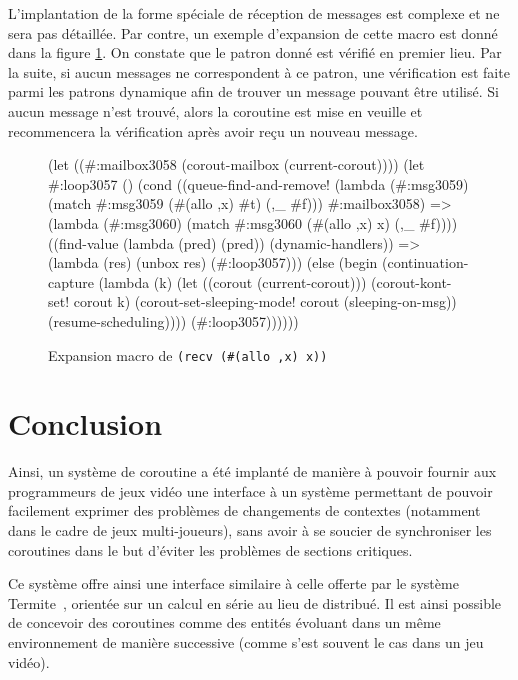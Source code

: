 \documentclass[12pt,oneside,letterpaper,francais]{book}
\newcommand{\scheme}[1]{\selectlanguage{english}{\tt #1}\selectlanguage{french}}
\begin{document}
L'implantation de la forme spéciale de réception de messages
\scheme{recv} est complexe et ne sera pas détaillée. Par contre, un
exemple d'expansion de cette macro est donné dans la figure
\ref{Corout:recv-exp}. On constate que le patron donné est vérifié en
premier lieu. Par la suite, si aucun messages ne correspondent à ce
patron, une vérification est faite parmi les patrons dynamique afin de
trouver un message pouvant être utilisé. Si aucun message n'est
trouvé, alors la coroutine est mise en veuille et recommencera la
vérification après avoir reçu un nouveau message.

\begin{figure}[htb!]
  \begin{schemecode}
(let ((\#:mailbox3058 (corout-mailbox (current-corout))))
  (let \#:loop3057 ()
    (cond ((queue-find-and-remove!
            (lambda (\#:msg3059) (match \#:msg3059 (\#(allo ,x) \#t) (,\_ \#f)))
            \#:mailbox3058)
           =>
           (lambda (\#:msg3060) (match \#:msg3060 (\#(allo ,x) x) (,\_ \#f))))
          ((find-value (lambda (pred) (pred)) (dynamic-handlers))
           =>
           (lambda (res) (unbox res) (\#:loop3057)))
          (else
           (begin
             (continuation-capture
              (lambda (k)
                (let ((corout (current-corout)))
                  (corout-kont-set! corout k)
                  (corout-set-sleeping-mode! corout (sleeping-on-msg))
                  (resume-scheduling))))
             (\#:loop3057))))))
  \end{schemecode}
  \caption{Expansion macro de \texttt{(recv (\#(allo ,x) x))}}
  \label{Corout:recv-exp}
\end{figure}


\section{Conclusion}

Ainsi, un système de coroutine a été implanté de manière à pouvoir
fournir aux programmeurs de jeux vidéo une interface à un système
permettant de pouvoir facilement exprimer des problèmes de changements
de contextes (notamment dans le cadre de jeux multi-joueurs), sans
avoir à se soucier de synchroniser les coroutines dans le but d'éviter
les problèmes de sections critiques.

Ce système offre ainsi une interface similaire à celle offerte par le
système Termite~\cite{Termite_paper}, orientée sur un calcul en série
au lieu de distribué. Il est ainsi possible de concevoir des
coroutines comme des entités évoluant dans un même environnement de
manière successive (comme s'est souvent le cas dans un jeu vidéo).
\end{document}
